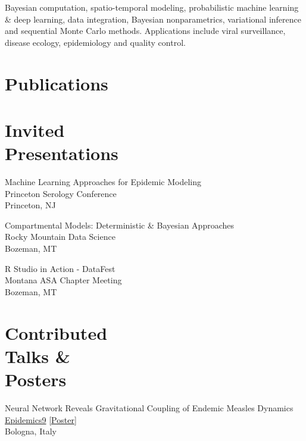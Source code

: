 \documentclass{wm_cv}
\begin{document}
Bayesian computation, spatio-temporal modeling, probabilistic machine learning \& deep learning, data integration, Bayesian nonparametrics, variational inference and sequential Monte Carlo methods. 
Applications include viral surveillance, disease ecology, epidemiology and quality control. 

\section{Publications}%


\section{Invited \\ Presentations}

Machine Learning Approaches for Epidemic Modeling\hfill {} \\
    \indent \quad Princeton Serology Conference  \\
   \indent \quad Princeton, NJ

Compartmental Models: Deterministic \& Bayesian Approaches \hfill {}\\ 
    \indent \quad Rocky Mountain Data Science  \\
   \indent \quad Bozeman, MT
   
R Studio in Action - DataFest \hfill {}\\ 
    \indent \quad Montana ASA Chapter Meeting  \\
   \indent \quad Bozeman, MT

\section{Contributed \\ Talks \& \\ Posters}
Neural Network Reveals Gravitational Coupling of Endemic Measles Dynamics \hfill {}\\
\indent \quad \href{https://www.elsevier.com/events/conferences/all/international-conference-on-infectious-disease-dynamics}{Epidemics9} [\href{https://www.wyattgmadden.com/files/posters/20231201epidemics/epidemics2023_poster.pdf}{Poster}] \\ 
   \indent \quad Bologna, Italy \\
\end{document}
